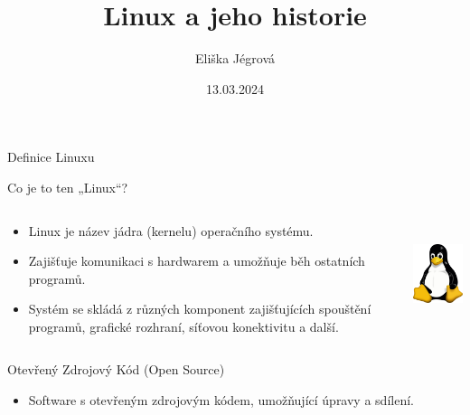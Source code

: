 \documentclass{beamer}
\title{Linux a jeho historie}
\author{Eliška Jégrová}
\date{13.03.2024}
\begin{document}
	
	\frame{\titlepage}


\begin{frame}{Definice Linuxu}
	\begin{block}{Co je to ten „Linux“?}
		    \begin{columns}
			\begin{column}{0.7\textwidth}
				\begin{itemize}
					\item Linux je název jádra (kernelu) operačního systému.
					\item Zajišťuje komunikaci s hardwarem a umožňuje běh ostatních programů.
					\item Systém se skládá z různých komponent zajišťujících spouštění programů, grafické rozhraní, síťovou konektivitu a další.
				\end{itemize}
			\end{column}
			\begin{column}{0.3\textwidth}
				\includegraphics[height=3cm]{tux.png}
			\end{column}
		\end{columns}
	\end{block}

	\begin{block}{Otevřený Zdrojový Kód (Open Source)}
		\begin{itemize}
			\item Software s otevřeným zdrojovým kódem, umožňující úpravy a sdílení.
		\end{itemize}
	\end{block}
\end{frame}
\end{document}
